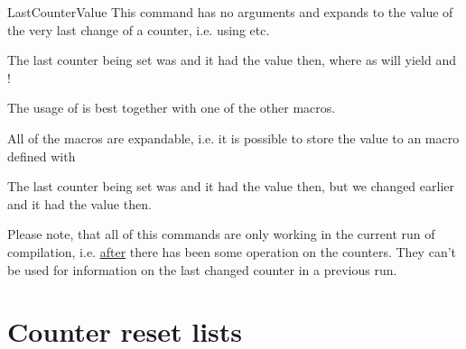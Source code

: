 \documentclass[12pt,a4paper,oneside]{article}
\begin{document}
\begin{docCommand}{LastCounterValue}{}
This command has no arguments and expands to the value of the very last change of a counter, i.e. using  etc.

\begin{dispExample}
    \setcounter{SomeCounter}{100}%

    The last counter being set  was \LastSetCounter and it had the value \LastCounterValue{} then, where as  will yield \fbox{\LastSteppedCounter} and \LastCounterValue!
\end{dispExample}%

The usage of  is best together with one of the other  macros. 

\end{docCommand}%

\begin{marker}
All of the  macros are expandable, i.e. it is possible to store the value to an macro defined with 
\end{marker}

\begin{dispExample}
    \setcounter{SomeCounter}{50}%

    \edef\lastcounterset{\LastSetCounter}
    \edef\lastcountervalue{\LastCounterValue}
   
    \setcounter{equation}{81}%


    The last counter being set was \fbox{\LastSetCounter} and it had the value \LastCounterValue{} then, but we changed \lastcounterset{} earlier and it had the value \lastcountervalue{} then.
\end{dispExample}%

\setcounter{equation}{1}




\begin{marker}
Please note, that all of this commands are only working in the current run of compilation, i.e. \underline{after} there has been some operation on the counters. They can't be used for information on the last changed counter in a previous run. 
\end{marker}





\section{Counter reset lists}
\end{document}
